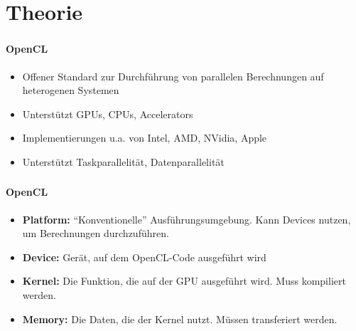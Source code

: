 \documentclass{beamer}
\begin{document}
\section{Theorie}
\label{sect:theory}

\begin{frame}
	\frametitle{}
	\framesubtitle{OpenCL}
	\begin{itemize}
		\item Offener Standard zur Durchführung von parallelen Berechnungen auf heterogenen Systemen
		\item Unterstützt GPUs, CPUs, Accelerators
		\item Implementierungen u.a. von Intel, AMD, NVidia, Apple
		\item Unterstützt Taskparallelität, Datenparallelität
	\end{itemize}
\end{frame}

\begin{frame}
	\frametitle{}
	\framesubtitle{OpenCL}
	\begin{itemize}
		\item \textbf{Platform:} ``Konventionelle'' Ausführungsumgebung. Kann Devices nutzen, um Berechnungen durchzuführen.
		\item \textbf{Device:} Gerät, auf dem OpenCL-Code ausgeführt wird
		\item \textbf{Kernel:} Die Funktion, die auf der GPU ausgeführt wird. Muss kompiliert werden.
		\item \textbf{Memory:} Die Daten, die der Kernel nutzt. Müssen transferiert werden.
	\end{itemize}
\end{frame}
\end{document}
